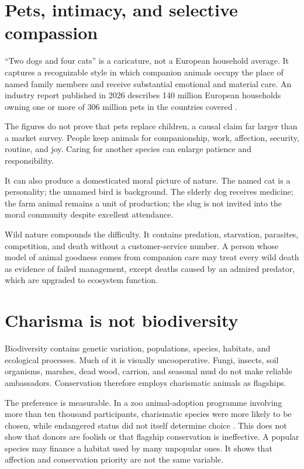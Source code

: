 \documentclass[12pt,a4paper]{book}
\begin{document}
\section{Pets, intimacy, and selective compassion}

``Two dogs and four cats'' is a caricature, not a European household average.
It captures a recognizable style in which companion animals occupy the place
of named family members and receive substantial emotional and material care.
An industry report published in 2026 describes 140 million European households
owning one or more of 306 million pets in the countries covered
\cite{FEDIAFStatistics2026}.

The figures do not prove that pets replace children, a causal claim far larger
than a market survey.  People keep animals for companionship, work, affection,
security, routine, and joy.  Caring for another species can enlarge patience
and responsibility.

It can also produce a domesticated moral picture of nature.  The named cat is
a personality; the unnamed bird is background.  The elderly dog receives
medicine; the farm animal remains a unit of production; the slug is not invited
into the moral community despite excellent attendance.

Wild nature compounds the difficulty.  It contains predation, starvation,
parasites, competition, and death without a customer-service number.  A person
whose model of animal goodness comes from companion care may treat every wild
death as evidence of failed management, except deaths caused by an admired
predator, which are upgraded to ecosystem function.

\section{Charisma is not biodiversity}

Biodiversity contains genetic variation, populations, species, habitats, and
ecological processes.  Much of it is visually uncooperative.  Fungi, insects,
soil organisms, marshes, dead wood, carrion, and seasonal mud do not make
reliable ambassadors.  Conservation therefore employs charismatic animals as
flagships.

The preference is measurable.  In a zoo animal-adoption programme involving
more than ten thousand participants, charismatic species were more likely to
be chosen, while endangered status did not itself determine choice
\cite{ColleonyCharisma2017}.  This does not show that donors are foolish or
that flagship conservation is ineffective.  A popular species may finance a
habitat used by many unpopular ones.  It shows that affection and conservation
priority are not the same variable.
\end{document}
